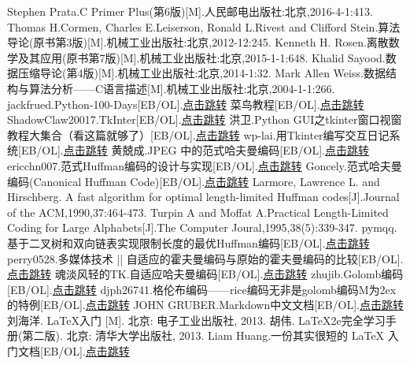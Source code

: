 \documentclass{ctexart}
\begin{document}
\begin{thebibliography}{99}
 Stephen Prata.C Primer Plus(第6版)[M].人民邮电出版社:北京,2016-4-1:413.
 Thomas H.Cormen, Charles E.Leiserson, Ronald L.Rivest and Clifford Stein.算法导论(原书第3版)[M].机械工业出版社:北京,2012-12:245.
 Kenneth H. Rosen.离散数学及其应用(原书第7版)[M].机械工业出版社:北京,2015-1-1:648.
 Khalid Sayood.数据压缩导论(第4版)[M].机械工业出版社:北京,2014-1:32.
 Mark Allen Weiss.数据结构与算法分析——C语言描述[M].机械工业出版社:北京,2004-1-1:266.
 jackfrued.Python-100-Days[EB/OL].\href{https://github.com/jackfrued/Python-100-Days}{点击跳转}
 菜鸟教程[EB/OL].\href{https://www.runoob.com/python3/python3-tutorial.html,unknown.}{点击跳转}
 ShadowClaw20017.TkInter[EB/OL].\href{https://wiki.python.org/moin/TkInter}{点击跳转}
 洪卫.Python GUI之tkinter窗口视窗教程大集合（看这篇就够了）[EB/OL].\href{https://sunhwee.com/posts/80fa3a85.html}{点击跳转}
 wp-lai.用Tkinter编写交互日记系统[EB/OL].\href{https://wp-lai.gitbooks.io/learn-python/content/1sTry/tkinter.html}{点击跳转}
 黄兢成.JPEG 中的范式哈夫曼编码[EB/OL].\href{https://zhuanlan.zhihu.com/p/72044095}{点击跳转}
 ericchn007.范式Huffman编码的设计与实现[EB/OL].\href{https://blog.csdn.net/ericchn007/article/details/2187022}{点击跳转}
 Goncely.范式哈夫曼编码(Canonical Huffman Code)[EB/OL].\href{https://www.cnblogs.com/goncely/archive/2006/03/06/2852153.html}{点击跳转}
 Larmore, Lawrence L. and Hirschberg. A fast algorithm for optimal length-limited Huffman codes[J].Journal of the ACM,1990,37:464-473.
 Turpin A and Moffat A.Practical Length-Limited Coding for Large Alphabets[J].The Computer Joural,1995,38(5):339-347.
 pymqq.基于二叉树和双向链表实现限制长度的最优Huffman编码[EB/OL].\href{https://blog.csdn.net/pymqq/article/details/32084763}{点击跳转}
 perry0528.多媒体技术 || 自适应的霍夫曼编码与原始的霍夫曼编码的比较[EB/OL].\href{https://blog.csdn.net/perry0528/article/details/84931004}{点击跳转}
 魂淡风轻的TK.自适应哈夫曼编码[EB/OL].\href{https://blog.csdn.net/qq_36533706/article/details/80381457}{点击跳转}
 zhujib.Golomb编码[EB/OL].\href{https://blog.csdn.net/u012434983/article/details/12709639}{点击跳转}
 djph26741.格伦布编码——rice编码无非是golomb编码M为2ex的特例[EB/OL].\href{https://blog.csdn.net/djph26741/article/details/101522093}{点击跳转}
 JOHN GRUBER.Markdown中文文档[EB/OL].\href{https://markdown-zh.readthedocs.io/en/latest/}{点击跳转}
 刘海洋. \LaTeX 入门 [M]. 北京: 电子工业出版社, 2013.
 胡伟. \LaTeX 2e完全学习手册(第二版). 北京: 清华大学出版社, 2013.
 Liam Huang.一份其实很短的 LaTeX 入门文档[EB/OL].\href{https://liam.page/2014/09/08/latex-introduction/#TeX_}{点击跳转}
\end{thebibliography}
\end{document}
